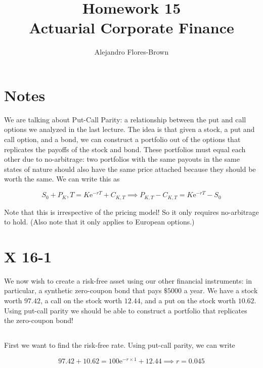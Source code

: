 \documentclass[12pt, letterpaper]{article}
\title{Homework 15 \\ Actuarial Corporate Finance}
\author{Alejandro Flores-Brown}
\newcommand{\e}{\mathrm{e}}
\begin{document}
    \maketitle

    \section{Notes}

    We are talking about Put-Call Parity: a relationship between the put and call options we analyzed in the last lecture. The idea is that given a stock, a put and call option, and a bond, we can construct a portfolio out of the options that replicates the payoffs of the stock and bond. These portfolios must equal each other due to no-arbitrage: two portfolios with the same payouts in the same states of nature should also have the same price attached because they should be worth the same. We can write this as 

    \[ S_0 + P_K,T = K \e^{-rT} + C_{K,T} \implies P_{K,T} - C_{K,T} = K \e^{-rT} - S_0    \]

    Note that this is irrespective of the pricing model! So it only requires no-arbitrage to hold. (Also note that it only applies to European options.)

    \section{X 16-1}

    We now wish to create a risk-free asset using our other financial instruments: in particular, a synthetic zero-coupon bond that pays \(\$5000\) a year. We have a stock worth \(97.42\), a call on the stock worth \(12.44\), and a put on the stock worth \(10.62\). Using put-call parity we should be able to construct a portfolio that replicates the zero-coupon bond!

    \subsection{}

    First we want to find the risk-free rate. Using put-call parity, we can write

    \[ 97.42 + 10.62 = 100\e^{-r \times 1} + 12.44 \implies \boxed{r = 0.045}  \]

    \subsection{}
\end{document}
